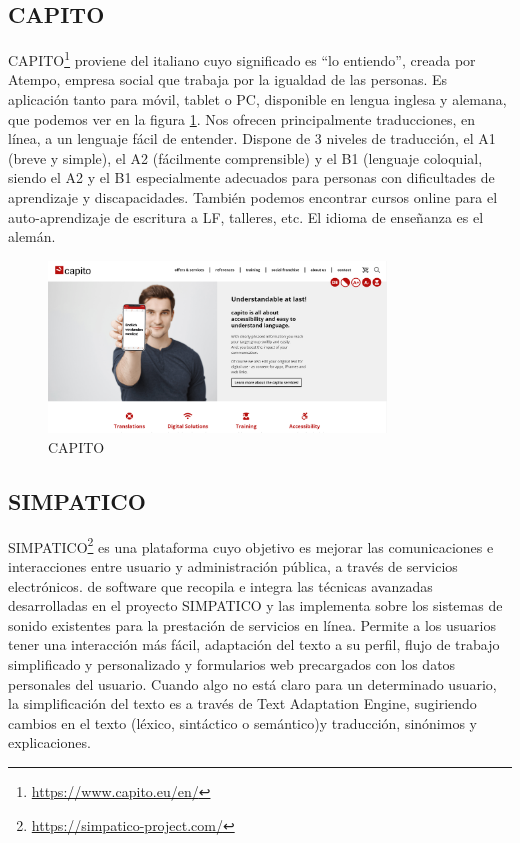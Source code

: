 \subsection{CAPITO }

CAPITO\footnote{\href{https://www.capito.eu/en/}{https://www.capito.eu/en/}} proviene del italiano cuyo significado es ``lo entiendo'', creada por Atempo, empresa social que trabaja por la igualdad de las personas. Es aplicación tanto para móvil, tablet o PC, disponible en lengua inglesa y alemana, que podemos ver en la figura \ref{fig:capito}. Nos ofrecen principalmente traducciones, en línea, a un lenguaje fácil de entender. Dispone de 3 niveles de traducción, el A1 (breve y simple), el A2 (fácilmente comprensible) y el B1 (lenguaje coloquial, siendo el A2 y el B1 especialmente adecuados para personas con dificultades de aprendizaje y discapacidades. 
También podemos encontrar cursos online para el auto-aprendizaje de escritura a LF, talleres, etc. El idioma de enseñanza es el alemán.
\begin{figure}[h]
	\centering
	\includegraphics[width=0.8\textwidth]{Imagenes/ProyectosMateriales/capito}
	\caption{CAPITO}
	\label{fig:capito}
\end{figure} 


\subsection{SIMPATICO }

SIMPATICO\footnote{\href{https://simpatico-project.com/}{https://simpatico-project.com/}} es una plataforma cuyo objetivo es mejorar las comunicaciones e interacciones entre usuario y administración pública, a través de servicios electrónicos.
de software que recopila e integra las técnicas avanzadas desarrolladas en el proyecto SIMPATICO y las implementa sobre los sistemas de sonido 
existentes para la prestación de servicios en línea. Permite a los usuarios tener una interacción más fácil, adaptación del texto a su perfil, flujo de trabajo simplificado y personalizado y formularios web precargados con los datos personales del usuario.
Cuando algo no está claro para un determinado usuario, la simplificación del texto es a través de Text Adaptation Engine, sugiriendo cambios en el texto (léxico, sintáctico o semántico)y traducción, sinónimos y explicaciones. 

